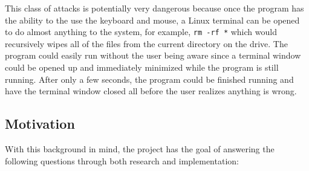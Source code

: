 \documentclass[pagenumbers]{ieee}
\begin{document}
This class of attacks is potentially very dangerous because once the program has the ability to the use the keyboard and mouse, a Linux terminal can be opened to do almost anything to the system, for example, \texttt{rm -rf *} which would recursively wipes all of the files from the current directory on the drive. The program could easily run without the user being aware since a terminal window could be opened up and immediately minimized while the program is still running. After only a few seconds, the program could be finished running and have the terminal window closed all before the user realizes anything is wrong.


\subsection{Motivation}
\label{section:motivation}

With this background in mind, the project has the goal of answering the following questions through both research and implementation:
\end{document}
